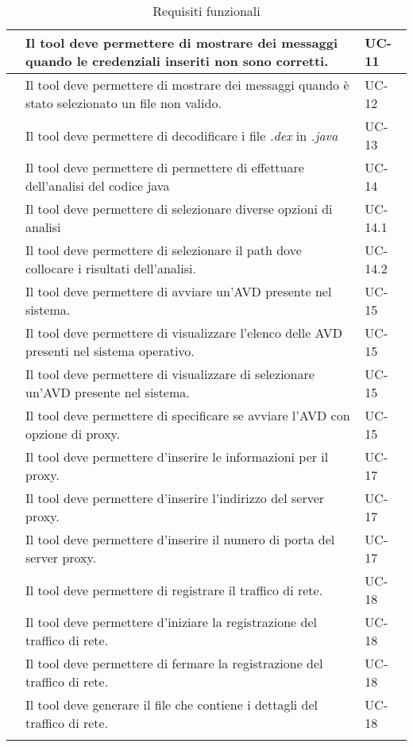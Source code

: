 \begin{center}
\begin{longtable}{ | c| C{7cm} |C{3cm} |}
        & Il tool deve permettere di mostrare dei messaggi quando le credenziali inseriti non sono corretti.& UC-11 \\\hline
        & Il tool deve permettere di mostrare dei messaggi quando è stato selezionato un file non valido.& UC-12 \\\hline
        & Il tool deve permettere di decodificare i file \textit{.dex} in \textit{.java} & UC-13\\\hline
        & Il tool deve permettere di permettere di effettuare dell'analisi del codice java& UC-14 \\\hline
        & Il tool deve permettere di selezionare diverse opzioni di analisi &UC-14.1 \\\hline
        & Il tool deve permettere di selezionare il path dove collocare i risultati dell'analisi.& UC-14.2\\\hline
        \setcounter{subCount}{0}

         & Il tool deve permettere di avviare un'AVD presente nel sistema.&UC-15\\\hline
         & Il tool deve permettere di visualizzare l'elenco delle AVD presenti nel sistema operativo.&UC-15\\\hline
         & Il tool deve permettere di visualizzare di selezionare un'AVD presente nel sistema.&UC-15\\\hline
         & Il tool deve permettere di specificare se avviare l'AVD con opzione di proxy.&UC-15\\\hline
        \setcounter{subCount}{0}
         & Il tool deve permettere d'inserire le informazioni per il proxy.&UC-17\\\hline
        & Il tool deve permettere d'inserire l'indirizzo del server proxy.&UC-17\\\hline
        & Il tool deve permettere d'inserire il numero di porta del server proxy.&UC-17\\\hline
        \setcounter{subCount}{0}
         & Il tool deve permettere di registrare il traffico di rete.&UC-18\\\hline
        & Il tool deve permettere d'iniziare la registrazione del traffico di rete.&UC-18\\\hline
        & Il tool deve permettere di fermare la registrazione del traffico di rete.&UC-18\\\hline
        & Il tool deve generare il file che contiene i dettagli del traffico di rete.&UC-18\\\hline


        \caption{Requisiti funzionali}
    \end{longtable}
\end{center}
\setcounter{rowcount}{0}

